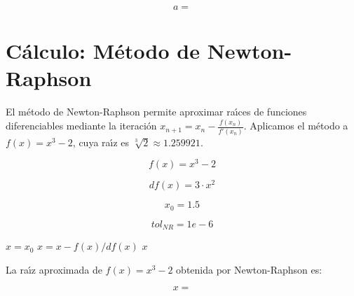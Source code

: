 \documentclass{article}
\begin{document}
\begin{equation}
    a = 
    \label{eq:res:a}
\end{equation}



\section{C\'alculo: M\'etodo de Newton-Raphson}

El m\'etodo de Newton-Raphson permite aproximar ra\'{\i}ces de funciones diferenciables
mediante la iteraci\'on $x_{n+1} = x_n - \frac{f(x_n)}{f'(x_n)}$.
Aplicamos el m\'etodo a $f(x) = x^3 - 2$, cuya ra\'{\i}z es $\sqrt[3]{2} \approx 1.259921$.

\begin{equation}
    f(x) = x^3 - 2
    \label{eq:calc:f}
\end{equation}

\begin{equation}
    df(x) = 3 \cdot x^2
    \label{eq:calc:df}
\end{equation}

\begin{equation}
    x_0 = 1.5
    \label{eq:calc:x0}
\end{equation}

\begin{equation}
    tol_{NR} = 1e-6
    \label{eq:calc:tolNR}
\end{equation}

\begin{algorithm}
\caption{M\'etodo de Newton-Raphson para $f(x) = x^3 - 2$}
\begin{algorithmic}
    \STATE $x = x_0$
        \STATE $x = x - f(x) / df(x)$
    \ENDWHILE
    \RETURN $x$
\end{algorithmic}
\end{algorithm}

La ra\'{\i}z aproximada de $f(x) = x^3 - 2$ obtenida por Newton-Raphson es:

\begin{equation}
    x =
    \label{eq:res:x}
\end{equation}

\end{document}
